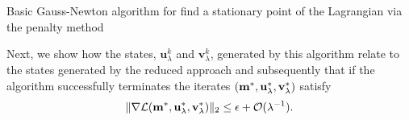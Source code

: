 \documentclass{iopart}
\begin{document}
\begin{algorithm}
\caption{Basic Gauss-Newton algorithm for find a stationary point of the Lagrangian via the penalty method}
\label{alg:penalty}
\begin{algorithmic}

\vspace{1mm}
\vspace{2mm}
\vspace{1mm}
\STATE{determine steplength $\alpha^k \in (0,1]$}
\vspace{1mm}
\vspace{1mm}
\vspace{2mm}
\vspace{1mm}
\ENDWHILE
\end{algorithmic}
\end{algorithm}
%

Next, we show how the states, $\mathbf{u}^k_{\lambda}$ and $\mathbf{v}^k_{\lambda}$, generated by this algorithm  relate to the states generated by the reduced approach and subsequently that if the algorithm successfully terminates the iterates $(\mathbf{m}^*, \mathbf{u}^*_{\lambda}, \mathbf{v}^*_{\lambda})$ satisfy 
\[
\|\nabla\mathcal{L}(\mathbf{m}^*, \mathbf{u}^*_{\lambda}, \mathbf{v}^*_{\lambda})\|_2 \leq \epsilon + \mathcal{O}(\lambda^{-1}). 
\]
\end{document}
